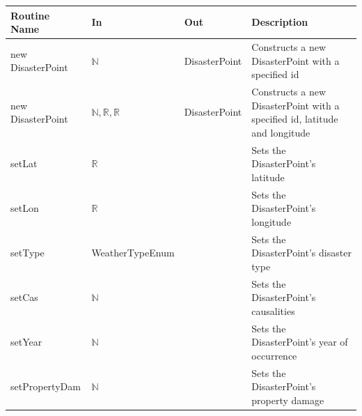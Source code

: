 \documentclass[12pt]{article}
\begin{document}
                \begin{tabular}{| l | l | l | p{5cm} |}
                    \hline
                    \textbf{Routine Name} & \textbf{In} & \textbf{Out} & \textbf{Description}\\
                    \hline
                    new DisasterPoint & $\mathbb{N}$ & DisasterPoint & Constructs a new DisasterPoint with a specified id\\
                    \hline
                    new DisasterPoint & $\mathbb{N}, \mathbb{R}, \mathbb{R}$ & DisasterPoint & Constructs a new DisasterPoint with a specified id, latitude and longitude\\
                    \hline
                    setLat & $\mathbb{R}$ & ~ & Sets the DisasterPoint's latitude \\
                    \hline
                    setLon & $\mathbb{R}$ & ~ & Sets the DisasterPoint's longitude\\
                    \hline
                    setType & WeatherTypeEnum & ~ & Sets the DisasterPoint's disaster type\\
                    \hline
                    setCas & $\mathbb{N}$ & ~ & Sets the DisasterPoint's causalities\\
                    \hline
                    setYear & $\mathbb{N}$ & ~ & Sets the DisasterPoint's year of occurrence\\
                    \hline
                    setPropertyDam & $\mathbb{N}$ & ~ & Sets the DisasterPoint's property damage\\
                    \hline
                    

\end{tabular}
\end{document}
